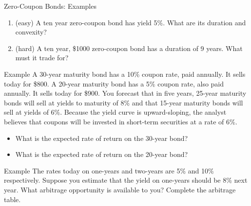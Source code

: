 \documentclass{beamer}
\begin{document}
\begin{frame}{Zero-Coupon Bonds: Examples}
    \begin{enumerate}
        \item (easy) A ten year zero-coupon bond has yield 5\%. What are its duration and convexity? 
        \item (hard) A ten year, \$1000 zero-coupon bond has a duration of 9 years. What must it trade for?
    \end{enumerate}
\end{frame}

\begin{frame}{Example}
    A 30-year maturity bond has a 10\% coupon rate, paid annually. It sells today for \$800. A 20-year maturity bond has a 5\% coupon rate, also paid annually. It sells today for \$900. You forecast that in five years, 25-year maturity bonds will sell at yields to maturity of 8\% and that 15-year maturity bonds will sell at yields of 6\%. Because the yield curve is upward-sloping, the analyst believes that coupons will be invested in short-term securities at a rate of 6\%.
    \begin{itemize}
    \item What is the expected rate of return on the 30-year bond?
    \item What is the expected rate of return on the 20-year bond? 
    \end{itemize}
\end{frame}

\begin{frame}{Example}
    The rates today on one-years and two-years are 5\% and 10\% respectively. Suppose you estimate that the yield on one-years should be 8\% next year. What arbitrage opportunity is available to you? Complete the arbitrage table. 
\end{frame}
\end{document}

